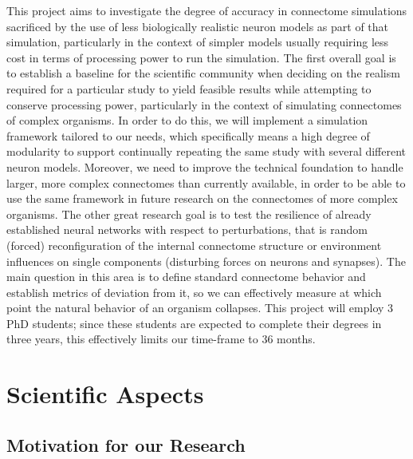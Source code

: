\documentclass[a4paper,11pt]{article}
\begin{document}
This project aims to investigate the degree of accuracy in connectome simulations sacrificed by the use of less biologically realistic neuron models as part of that simulation, particularly in the context of simpler models usually requiring less cost in terms of processing power to run the simulation. The first overall goal is to establish a baseline for the scientific community when deciding on the realism required for a particular study to yield feasible results while attempting to conserve processing power, particularly in the context of simulating connectomes of complex organisms. In order to do this, we will implement a simulation framework tailored to our needs, which specifically means a high degree of modularity to support continually repeating the same study with several different neuron models. Moreover, we need to improve the technical foundation to handle larger, more complex connectomes than currently available, in order to be able to use the same framework in future research on the connectomes of more complex organisms. The other great research goal is to test the resilience of already established neural networks with respect to perturbations, that is random (forced) reconfiguration of the internal connectome structure or environment influences on single components (disturbing forces on neurons and synapses). The main question in this area is to define standard connectome behavior and establish metrics of deviation from it, so we can effectively measure at which point the natural behavior of an organism collapses. This project will employ 3 PhD students; since these students are expected to complete their degrees in three years, this effectively limits our time-frame to 36 months.


\newpage
%
%
\vspace{\baselineskip}
\vspace*{10mm}
\tableofcontents
\newpage
%
%
\section{Scientific Aspects}
\subsection{Motivation for our Research}
\end{document}
